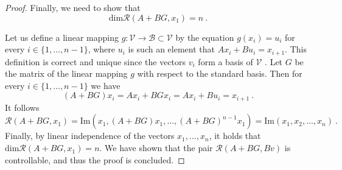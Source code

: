 \begin{proof}
    Finally, we need to show that
    $$\text{dim}\mathcal{R}(A+BG,x_1)=n\ .$$

    Let us define a linear mapping $g\colon\mathcal{V}\to\mathcal{B}\subset \mathcal{V}$ by the equation $g(x_i)=u_i$ for every $i\in\{1,\dots,n-1\}$, where $u_i$ is  such an element that $Ax_i+Bu_i=x_{i+1}$. This definition is correct and unique since the vectors $v_i$ form a basis of $\mathcal{V}$ \citep[see][Tvrzení 6.4]{Barto}. Let $G$ be the matrix of the linear mapping $g$ with respect to the standard basis. Then for every $i\in\{1,\ldots,n-1\}$ we have
    $$(A+BG)x_i=Ax_i+BGx_i=Ax_i+Bu_i=x_{i+1}\ .$$
    It follows 
    $$\mathcal{R}(A+BG,x_1)=\text{Im}(x_1,(A+BG)x_1,\ldots,(A+BG)^{n-1}x_1)=\text{Im}(x_1,x_2,\ldots,x_n)\ .$$
    Finally, by linear independence of the vectors $x_1,\ldots,x_n$, it holds that $\text{dim}\mathcal{R}(A+BG,x_1)=n$. We have shown that the pair $\mathcal{R}(A+BG,Bv)$ is controllable, and thus the proof is concluded.
\end{proof}